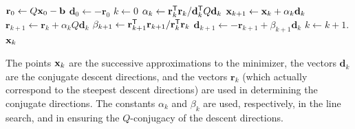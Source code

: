 \begin{algorithm}[H]
\begin{algorithmic}[1]
    \State $\mathbf{r}_0 \gets Q\mathbf{x}_0 - \mathbf{b}$
    \State $\mathbf{d}_0 \gets -\mathbf{r}_0$
    \State $k \gets 0$
        \State $\alpha_k \gets \mathbf{r}_k^{\mathsf T} \mathbf{r}_k / \mathbf{d}_k^{\mathsf T} Q\mathbf{d}_k$
        \State $\mathbf{x}_{k+1} \gets \mathbf{x}_k + \alpha_k \mathbf{d}_k$
        \State $\mathbf{r}_{k+1} \gets \mathbf{r}_k + \alpha_k Q\mathbf{d}_k$
        \State $\beta_{k+1} \gets \mathbf{r}_{k+1}^{\mathsf T} \mathbf{r}_{k+1} / \mathbf{r}_k^{\mathsf T} \mathbf{r}_k$
        \State $\mathbf{d}_{k+1} \gets -\mathbf{r}_{k+1} + \beta_{k+1}\mathbf{d}_k$
        \State $k \gets k+1$.
    \EndWhile
     $\mathbf{x}_k$
\EndProcedure
\end{algorithmic}
\caption{}
\label{Alg:linear-conjugate-gradient}
\end{algorithm}

The points $\mathbf{x}_k$ are the successive approximations to the minimizer, the vectors $\mathbf{d}_k$ are the conjugate descent directions, and the vectors $\mathbf{r}_k$ (which actually correspond to the steepest descent directions) are used in determining the conjugate directions.
The constants $\alpha_k$ and $\beta_k$ are used, respectively, in the line search, and in ensuring the $Q$-conjugacy of the descent directions.

